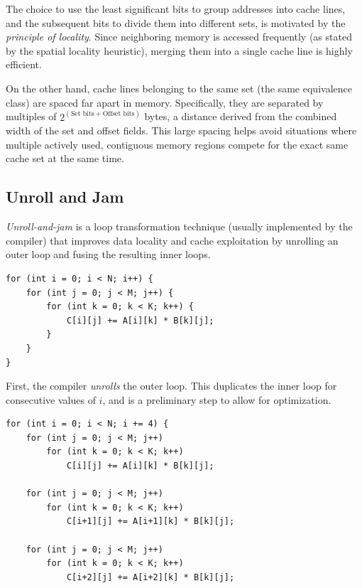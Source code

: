 \begin{appendices}
The choice to use the least significant bits to group addresses into cache lines, and the subsequent bits to divide them into different sets, is motivated by the \emph{principle of locality}. Since neighboring memory is accessed frequently (as stated by the spatial locality heuristic), merging them into a single cache line is highly efficient. 


On the other hand, cache lines belonging to the same set (the same equivalence class) are spaced far apart in memory. Specifically, they are separated by multiples of $2^{(\text{Set bits} + \text{Offset bits})}$ bytes, a distance derived from the combined width of the set and offset fields. This large spacing helps avoid situations where multiple actively used, contiguous memory regions compete for the exact same cache set at the same time.




\subsection{Unroll and Jam}\label{subsec:unroll_jam}

\emph{Unroll-and-jam} is a loop transformation technique (usually implemented by the compiler) that improves data locality and cache exploitation by unrolling an outer loop and fusing the resulting inner loops. 

\begin{lstlisting}[style=CStyle, caption={Original for loops}]
for (int i = 0; i < N; i++) {
    for (int j = 0; j < M; j++) {
        for (int k = 0; k < K; k++) {
            C[i][j] += A[i][k] * B[k][j];
        }
    }
}
\end{lstlisting}

First, the compiler \emph{unrolls} the outer loop.
This duplicates the inner loop for consecutive values of $i$, and is a preliminary step  to allow for optimization.

\begin{lstlisting}[style=CStyle, caption={Loop unrolled (factor of $4$)}]
for (int i = 0; i < N; i += 4) {
    for (int j = 0; j < M; j++)
        for (int k = 0; k < K; k++)
            C[i][j] += A[i][k] * B[k][j];

    for (int j = 0; j < M; j++)
        for (int k = 0; k < K; k++)
            C[i+1][j] += A[i+1][k] * B[k][j];

    for (int j = 0; j < M; j++)
        for (int k = 0; k < K; k++)
            C[i+2][j] += A[i+2][k] * B[k][j];


\end{lstlisting}
\end{appendices}
